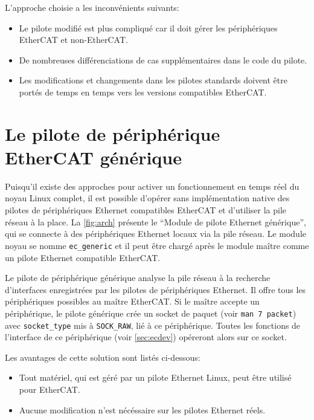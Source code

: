 \documentclass[a4paper,12pt,BCOR=6mm,bibtotoc,idxtotoc]{scrbook}
\begin{document}
L'approche choisie a les inconv\'enients suivants:

\begin{itemize}
\item Le pilote modifi\'e est plus compliqu\'e car il doit g\'erer les
  p\'eriph\'eriques EtherCAT et non-EtherCAT.
\item De nombreuses diff\'erenciations de cas suppl\'ementaires dans le
  code du pilote.
\item Les modifications et changements dans les pilotes standards
  doivent \^etre port\'es de temps en temps vers les versions compatibles
  EtherCAT.
\end{itemize}


\section{Le pilote de p\'eriph\'erique EtherCAT g\'en\'erique}
\label{sec:generic-driver}

Puisqu'il existe des approches pour activer un fonctionnement en temps
r\'eel \cite{rt-preempt} du noyau Linux complet, il est possible
d'op\'erer sans impl\'ementation native des pilotes de
p\'eriph\'eriques Ethernet compatibles EtherCAT et d'utiliser la pile
r\'eseau \`a la place. La \autoref{fig:arch} pr\'esente le ``Module de
pilote Ethernet g\'en\'erique'', qui se connecte \`a des
p\'eriph\'eriques Ethernet locaux via la pile r\'eseau.  Le module
noyau se nomme \lstinline+ec_generic+ et il peut \^etre charg\'e
apr\`es le module ma\^itre comme un pilote Ethernet compatible
EtherCAT.

Le pilote de p\'eriph\'erique g\'en\'erique analyse la pile r\'eseau
\`a la recherche d'interfaces enregistr\'ees par les pilotes de
p\'eriph\'eriques Ethernet.  Il offre tous les p\'eriph\'eriques
possibles au ma\^itre EtherCAT. Si le ma\^itre accepte un
p\'eriph\'erique, le pilote g\'en\'erique cr\'ee un socket de paquet
(voir \lstinline+man 7 packet+) avec \lstinline+socket_type+ mis \`a
\lstinline+SOCK_RAW+, li\'e \`a ce p\'eriph\'erique.  Toutes les
fonctions de l'interface de ce p\'eriph\'erique (voir
\autoref{sec:ecdev}) op\'ereront alors sur ce socket.

Les avantages de cette solution sont list\'es ci-dessous:

\begin{itemize}
\item Tout mat\'eriel, qui est g\'er\'e par un pilote Ethernet
  Linux, peut \^etre utilis\'e pour EtherCAT.
\item Aucune modification n'est n\'ec\'essaire sur les pilotes Ethernet
  r\'eels.
\end{itemize}
\end{document}
